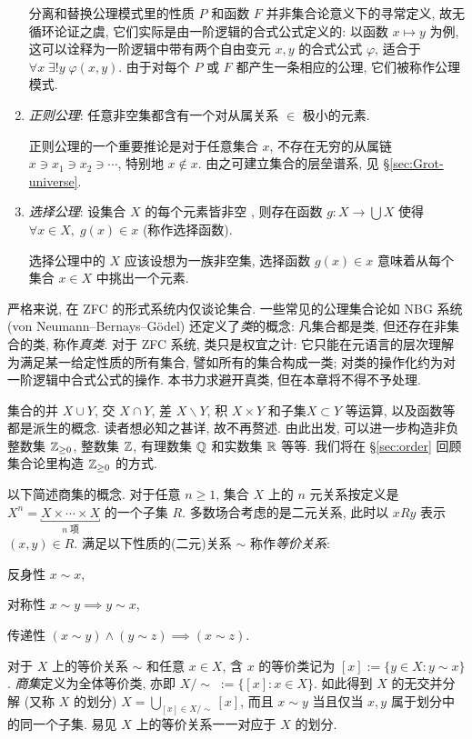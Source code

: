 \begin{enumerate}[\bfseries {A}.1]
		分离和替换公理模式里的性质 $P$ 和函数 $F$ 并非集合论意义下的寻常定义, 故无循环论证之虞, 它们实际是由一阶逻辑的合式公式定义的: 以函数 $x \mapsto y$ 为例, 这可以诠释为一阶逻辑中带有两个自由变元 $x,y$ 的合式公式 $\varphi$, 适合于 $\forall x\; \exists! y\; \varphi(x,y)$. 由于对每个 $P$ 或 $F$ 都产生一条相应的公理, 它们被称作公理模式.
	\item \emph{正则公理}: 任意非空集都含有一个对从属关系 $\in$ 极小的元素.
	
		正则公理的一个重要推论是对于任意集合 $x$, 不存在无穷的从属链 $x \ni x_1 \ni x_2 \ni \cdots$, 特别地 $x \notin x$. 由之可建立集合的层垒谱系, 见 \S\ref{sec:Grot-universe}.
	\item \emph{选择公理}: 设集合 $X$ 的每个元素皆非空 , 则存在函数 $g: X \to \bigcup X$ 使得 $\forall x \in X, \; g(x) \in x$ (称作选择函数).

		选择公理中的 $X$ 应该设想为一族非空集, 选择函数 $g(x) \in x$ 意味着从每个集合 $x \in X$ 中挑出一个元素.
\end{enumerate}

严格来说, 在 ZFC 的形式系统内仅谈论集合. 一些常见的公理集合论如 NBG 系统 (von Neumann--Bernays--Gödel) 还定义了\emph{类}的概念: 凡集合都是类, 但还存在非集合的类, 称作\emph{真类}. 对于 ZFC 系统, 类只是权宜之计: 它只能在元语言的层次理解为满足某一给定性质的所有集合, 譬如所有的集合构成一类; 对类的操作化约为对一阶逻辑中合式公式的操作. 本书力求避开真类, 但在本章将不得不予处理.

集合的并 $X \cup Y$, 交 $X \cap Y$, 差 $X \smallsetminus Y$, 积 $X \times Y$ 和子集$X \subset Y$ 等运算, 以及函数等都是派生的概念. 读者想必知之甚详, 故不再赘述. 由此出发, 可以进一步构造非负整数集 $\mathbb{Z}_{\geq 0}$, 整数集 $\mathbb{Z}$, 有理数集 $\mathbb{Q}$ 和实数集 $\mathbb{R}$ 等等. 我们将在 \S\ref{sec:order} 回顾集合论里构造 $\mathbb{Z}_{\geq 0}$ 的方式.

以下简述商集的概念. 对于任意 $n \geq 1$, 集合 $X$ 上的 $n$ 元关系按定义是 $X^n = \underbracket{X \times \cdots \times X}_{n\; \text{项}}$ 的一个子集 $R$. 多数场合考虑的是二元关系, 此时以 $xRy$ 表示 $(x,y) \in R$. 满足以下性质的(二元)关系 $\sim$ 称作\emph{等价关系}:
\begin{compactdesc}
	\item[反身性] $x \sim x$,
	\item[对称性] $x \sim y \implies y \sim x$,
	\item[传递性] $(x \sim y) \wedge (y \sim z) \implies (x \sim z)$.
\end{compactdesc}
对于 $X$ 上的等价关系 $\sim$ 和任意 $x \in X$, 含 $x$ 的等价类记为 $[x] := \{y \in X: y \sim x \}$. \emph{商集}定义为全体等价类, 亦即 $X/\sim\; := \{[x] : x \in X \}$. 如此得到 $X$ 的无交并分解 (又称 $X$ 的划分) $X = \bigcup_{[x] \in X/\sim} [x]$, 而且 $x \sim y$ 当且仅当 $x,y$ 属于划分中的同一个子集. 易见 $X$ 上的等价关系一一对应于 $X$ 的划分.

